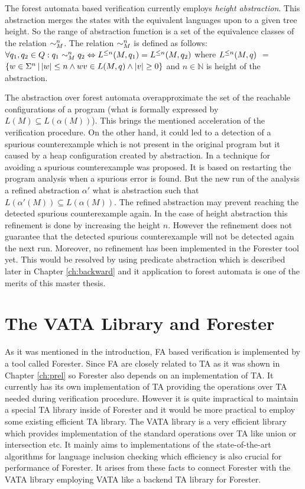 The forest automata based verification currently employs \emph{height abstraction}.
This abstraction merges the states with the equivalent
languages upon to a given tree height.
So the range of abstraction function is a set of the equivalence classes of the relation $\sim^n_M$.
The relation $\sim^n_M$ is defined as follows:
$\forall q_1,q_2 \in Q: q_1 \sim^n_M q_2 \Leftrightarrow L^{\leq n}(M,q_1) = L^{\leq n}(M,q_2)$ where
$L^{\leq n}(M,q)$ $=$ $\{ w \in \Sigma^n \,|\, |w| \leq n \wedge wv \in L(M,q) \wedge |v| \geq 0\}$
and $n\in \mathbb{N}$ is height of the abstraction.

The abstraction over forest automata overapproximate the set of the reachable
configurations of a program (what is formally expressed by $L(M) \subseteq L(\alpha(M))$).
This brings the mentioned acceleration of the verification procedure.
On the other hand, it could led to a detection of a spurious counterexample which is not present
in the original program but it caused by a heap configuration created by abstraction.
In \cite{cegar} a technique for avoiding a spurious counterexample was proposed.
It is based on restarting the program analysis when a spurious error is found.
But the new run of the analysis  a refined abstraction $\alpha'$
what is abstraction such that $L(\alpha'(M)) \subseteq L(\alpha(M))$.
The refined abstraction may prevent reaching the detected spurious counterexample again.
In the case of height abstraction this refinement is done by increasing the height $n$.
However the refinement does not guarantee that the detected spurious counterexample will not
be detected again the next run.
Moreover, no refinement has been implemented in the Forester tool yet.
This would be resolved by using predicate abstraction which is described later in Chapter \ref{ch:backward}
and it application to forest automata is one of the merits of this master thesis.

\chapter{The VATA Library and Forester}
\label{ch:tools}

As it was mentioned in the introduction, FA based verification is implemented by a tool
called Forester.
Since FA are closely related to TA as it was shown in Chapter \ref{ch:prel} so
Forester also depends on an implementation of TA.
It currently has its own implementation of TA providing the operations over TA needed during verification procedure.
However it is quite impractical to maintain a special TA library inside of Forester
and it would be more practical to employ some existing efficient TA library.
The VATA library is a very efficient library which provides implementation
of the standard operations over TA like union or intersection etc.
It mainly aims to implementations of the state-of-the-art algorithms \cite{tacas10}
for language inclusion checking which efficiency
is also crucial for performance of Forester.
It arises from these facts to connect Forester with the VATA library
employing VATA like a backend TA library for Forester.

